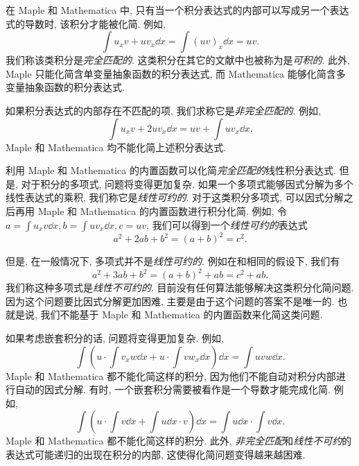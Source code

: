 在 Maple 和 Mathematica 中, 只有当一个积分表达式的内部可以写成另一个表达式的导数时, 该积分才能被化简. 例如, 
\begin{equation}
\int\!{u_xv+uv_x \dd x}=\int\!{(uv)_x\dd x}=uv.
\label{complete_matched}
\end{equation}
我们称该类积分是\emph{完全匹配的}. 这类积分在其它的文献中也被称为是\emph{可积的}. 此外, Maple 只能化简含单变量抽象函数的积分表达式, 而 Mathematica 能够化简含多变量抽象函数的积分表达式. 

如果积分表达式的内部存在不匹配的项, 我们求称它是\emph{非完全匹配的}. 例如,
\begin{equation}
\int\!{u_xv+2uv_x \dd x}=uv+\int\!{uv_x\dd x}.
\label{incomplete_matched}
\end{equation}
Maple 和 Mathematica 均不能化简上述积分表达式. 

利用 Maple 和 Mathematica 的内置函数可以化简\emph{完全匹配的}线性积分表达式. 但是, 对于积分的多项式, 问题将变得更加复杂. 如果一个多项式能够因式分解为多个线性表达式的乘积, 我们称它是\emph{线性可约的}. 对于这类积分多项式, 可以因式分解之后再用 Maple 和 Mathematica 的内置函数进行积分化简. 例如, 令$a=\int{u_x v \dd x},b=\int{u v_x \dd x},c=uv$, 我们可以得到一个\emph{线性可约的}表达式
\begin{equation}
a^2+2ab+b^2=(a+b)^2=c^2.
\label{liner_reducible}
\end{equation}

但是, 在一般情况下, 多项式并不是\emph{线性可约的}. 例如在和相同的假设下, 我们有
\begin{equation}
a^2+3ab+b^2=(a+b)^2+ab=c^2+ab.
\label{non_linear_reducible}
\end{equation} 
我们称这种多项式是\emph{线性不可约的}. 目前没有任何算法能够解决这类积分化简问题. 因为这个问题要比因式分解更加困难, 主要是由于这个问题的答案不是唯一的. 也就是说, 我们不能基于 Maple 和 Mathematica 的内置函数来化简这类问题. 

如果考虑嵌套积分的话, 问题将变得更加复杂. 例如, 
\begin{equation}
\int\!{\left(u\cdot\int\!{v_xw\dd x}+u\cdot\int\!{vw_x\dd x}\right)\dd x}=\int\!{uvw\dd x}.
\label{nested_integral}
\end{equation}
Maple 和 Mathematica 都不能化简这样的积分, 因为他们不能自动对积分内部进行自动的因式分解. 有时, 一个嵌套积分需要被看作是一个导数才能完成化简. 例如,
\begin{equation}
\int\!{\left(u\cdot\int\!{v\dd x}+\int\!{u\dd x}\cdot v\right)\dd x}=\int\!{u\dd x}\cdot\int\!{v\dd x}.
\label{integral_as_differential}
\end{equation}
Maple 和 Mathematica 都不能化简这样的积分. 此外, \emph{非完全匹配}和\emph{线性不可约}的表达式可能递归的出现在积分的内部, 这使得化简问题变得越来越困难.

